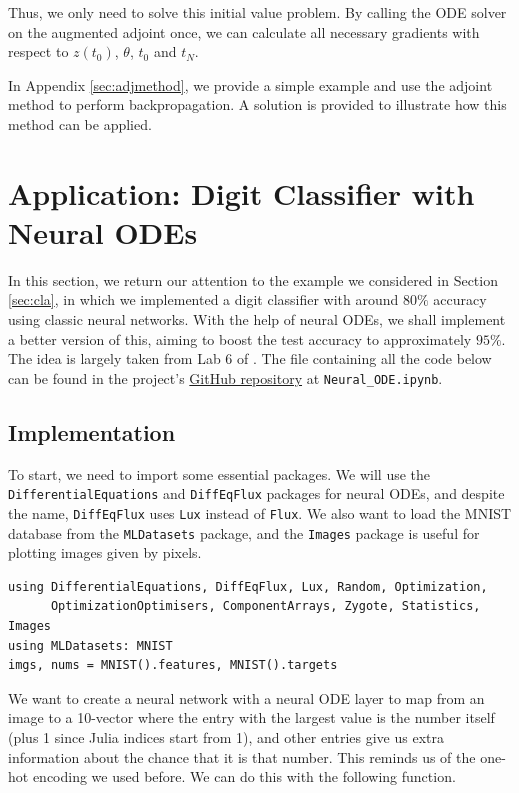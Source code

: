 \documentclass[a4paper,11pt,titlepage]{article}
\theoremstyle{definition}
\theoremstyle{plain}
\theoremstyle{remark}
\begin{document}
Thus, we only need to solve this initial value problem. By calling the ODE solver on the augmented adjoint once, we can calculate all necessary gradients with respect to $z(t_0)$, $\theta$, $t_0$ and $t_N$.

In Appendix \ref{sec:adjmethod}, we provide a simple example and use the adjoint method to perform backpropagation. A solution is provided to illustrate how this method can be applied.

\pagebreak
\section{Application: Digit Classifier with Neural ODEs}
\label{sec:app}

In this section, we return our attention to the example we considered in Section \ref{sec:cla}, in which we implemented a digit classifier with around $80\%$ accuracy using classic neural networks. With the help of neural ODEs, we shall implement a better version of this, aiming to boost the test accuracy to approximately $95\%$. The idea is largely taken from Lab 6 of \cite{SciMLSANUM2024}. The file containing all the code below can be found in the project's \href{https://github.com/jaamestaay/M2R-Group-29}{GitHub repository} at \verb|Neural_ODE.ipynb|.

\subsection{Implementation}

To start, we need to import some essential packages. We will use the \verb|DifferentialEquations| and \verb|DiffEqFlux| packages for neural ODEs, and despite the name, \verb|DiffEqFlux| uses \verb|Lux| instead of \verb|Flux|. We also want to load the MNIST database from the \verb|MLDatasets| package, and the \verb|Images| package is useful for plotting images given by pixels.

\begin{verbatim}
using DifferentialEquations, DiffEqFlux, Lux, Random, Optimization,
      OptimizationOptimisers, ComponentArrays, Zygote, Statistics, Images
using MLDatasets: MNIST
imgs, nums = MNIST().features, MNIST().targets
\end{verbatim}

We want to create a neural network with a neural ODE layer to map from an image to a 10-vector where the entry with the largest value is the number itself (plus 1 since Julia indices start from 1), and other entries give us extra information about the chance that it is that number. This reminds us of the one-hot encoding we used before. We can do this with the following function.
\end{document}
